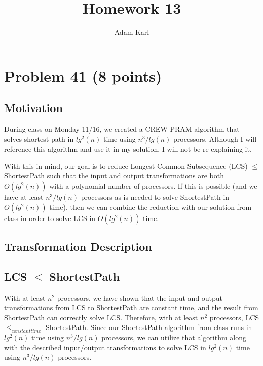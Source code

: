 \documentclass[a4paper]{article}
\title{Homework 13}
\author{Adam Karl}
\begin{document}
\maketitle

\section{Problem 41 (8 points)}
\subsection{Motivation}
During class on Monday 11/16, we created a CREW PRAM algorithm that solves shortest path in $lg^2(n)$ time using $n^3/lg(n)$ processors. Although I will reference this algorithm and use it in my solution, I will not be re-explaining it.

With this in mind, our goal is to reduce Longest Common Subsequence (LCS) $\leq$ ShortestPath such that the input and output transformations are both $O(lg^2(n))$ with a polynomial number of processors. If this is possible (and we have at least $n^3/lg(n)$ processors as is needed to solve ShortestPath in $O(lg^2(n))$ time), then we can combine the reduction with our solution from class in order to solve LCS in $O(lg^2(n))$ time.

\subsection{Transformation Description}


\subsection{LCS $\leq$ ShortestPath}
With at least $n^2$ processors, we have shown that the input and output transformations from LCS to ShortestPath are constant time, and the result from ShortestPath can correctly solve LCS. Therefore, with at least $n^2$ processors, LCS $\leq _{constant time}$ ShortestPath. Since our ShortestPath algorithm from class runs in $lg^2(n)$ time using $n^3/lg(n)$ processors, we can utilize that algorithm along with the described input/output transformations to solve LCS in $lg^2(n)$ time using $n^3/lg(n)$ processors.
\end{document}
